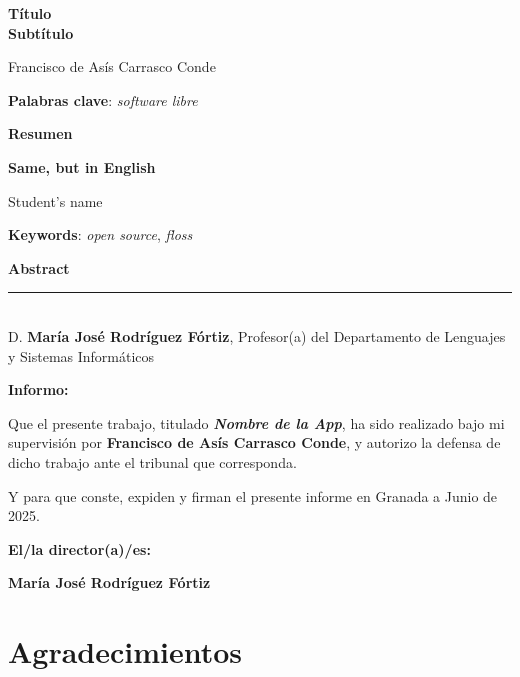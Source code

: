 \thispagestyle{empty}

\begin{center}
{\large\bfseries Título \\ Subtítulo }\\
\end{center}
\begin{center}
Francisco de Asís Carrasco Conde\\
\end{center}


\vspace{0.5cm}
\noindent\textbf{Palabras clave}: \textit{software libre}
\vspace{0.7cm}

\noindent\textbf{Resumen}\\
	

\cleardoublepage

\begin{center}
	{\large\bfseries Same, but in English}\\
\end{center}
\begin{center}
	Student's name\\
\end{center}
\vspace{0.5cm}
\noindent\textbf{Keywords}: \textit{open source}, \textit{floss}
\vspace{0.7cm}

\noindent\textbf{Abstract}\\


\cleardoublepage

\thispagestyle{empty}

\noindent\rule[-1ex]{\textwidth}{2pt}\\[4.5ex]

D. \textbf{María José Rodríguez Fórtiz}, Profesor(a) del Departamento de Lenguajes y Sistemas Informáticos

\vspace{0.5cm}

\textbf{Informo:}

\vspace{0.5cm}

Que el presente trabajo, titulado \textit{\textbf{Nombre de la App}},
ha sido realizado bajo mi supervisión por \textbf{Francisco de Asís Carrasco Conde}, y autorizo la defensa de dicho trabajo ante el tribunal
que corresponda.

\vspace{0.5cm}

Y para que conste, expiden y firman el presente informe en Granada a Junio de 2025.

\vspace{1cm}

\textbf{El/la director(a)/es: }

\vspace{5cm}

\noindent \textbf{María José Rodríguez Fórtiz}

\chapter*{Agradecimientos}




